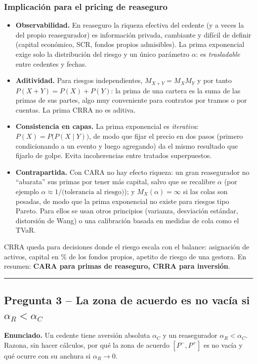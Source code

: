 \documentclass[a4paper,12pt]{article}
\begin{document}
\subsubsection*{Implicaci\'on para el pricing de reaseguro}
\begin{itemize}[leftmargin=*]
\item \textbf{Observabilidad.} En reaseguro la riqueza efectiva del cedente (y a veces la del propio reasegurador) es informaci\'on privada, cambiante y dif\'icil de definir (capital econ\'omico, SCR, fondos propios admisibles). La prima exponencial exige solo la distribuci\'on del riesgo y un \'unico par\'ametro $\alpha$: es \emph{trasladable} entre cedentes y fechas.
\item \textbf{Aditividad.} Para riesgos independientes, $M_{X+Y}=M_XM_Y$ y por tanto $P(X+Y)=P(X)+P(Y)$: la prima de una cartera es la suma de las primas de sus partes, algo muy conveniente para contratos por tramos o por cuentas. La prima CRRA no es aditiva.
\item \textbf{Consistencia en capas.} La prima exponencial es \emph{iterativa}: $P(X)=P\big(P(X\mid Y)\big)$, de modo que fijar el precio en dos pasos (primero condicionando a un evento y luego agregando) da el mismo resultado que fijarlo de golpe. Evita incoherencias entre tratados superpuestos.
\item \textbf{Contrapartida.} Con CARA no hay efecto riqueza: un gran reasegurador no ``abarata'' sus primas por tener m\'as capital, salvo que se recalibre $\alpha$ (por ejemplo $\alpha\approx1/\text{(tolerancia al riesgo)}$); y $M_X(\alpha)=\infty$ si las colas son pesadas, de modo que la prima exponencial no existe para riesgos tipo Pareto. Para ellos se usan otros principios (varianza, desviaci\'on est\'andar, distorsi\'on de Wang) o una calibraci\'on basada en medidas de cola como el TVaR.
\end{itemize}
CRRA queda para decisiones donde el riesgo escala con el balance: asignaci\'on de activos, capital en \% de los fondos propios, apetito de riesgo de una gestora. En resumen: \textbf{CARA para primas de reaseguro, CRRA para inversi\'on}.

\bigskip\hrule\bigskip

\subsection{Pregunta 3 -- La zona de acuerdo es no vac\'ia si $\alpha_R<\alpha_C$}

\noindent\textbf{Enunciado.} Un cedente tiene aversi\'on absoluta $\alpha_C$ y un reasegurador $\alpha_R<\alpha_C$. Razona, sin hacer c\'alculos, por qu\'e la zona de acuerdo $[P^-,P^+]$ es no vac\'ia y qu\'e ocurre con su anchura si $\alpha_R\to0$.
\end{document}
